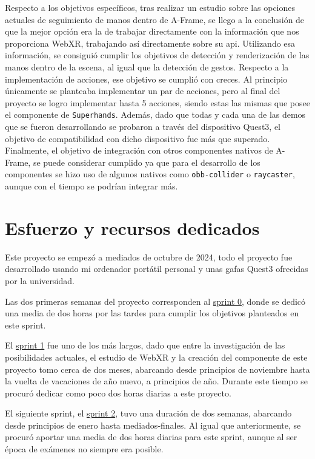 \documentclass[a4paper, 12pt]{book}
\begin{document}
Respecto a los objetivos específicos, tras realizar un estudio sobre las opciones actuales de seguimiento de manos dentro de A-Frame, se llego a la conclusión de que la mejor opción era la de trabajar directamente con la información que nos proporciona WebXR, trabajando así directamente sobre su api. 
Utilizando esa información, se consiguió cumplir los objetivos de detección y renderización de las manos dentro de la escena, al igual que la detección de gestos. 
Respecto a la implementación de acciones, ese objetivo se cumplió con creces. Al principio únicamente se planteaba implementar un par de acciones, pero al final del proyecto se logro implementar hasta 5 acciones, siendo estas las mismas que posee el componente de \texttt{Superhands}.
Además, dado que todas y cada una de las demos que se fueron desarrollando se probaron a través del dispositivo Quest3, el objetivo de compatibilidad con dicho dispositivo fue más que superado.
Finalmente, el objetivo de integración con otros componentes nativos de A-Frame, se puede considerar cumplido ya que para el desarrollo de los componentes se hizo uso de algunos nativos como \texttt{obb-collider} o \texttt{raycaster}, aunque con el tiempo se podrían integrar más.

\section{Esfuerzo y recursos dedicados}
\label{sec:esfuerzos}

Este proyecto se empezó a mediados de octubre de 2024, todo el proyecto fue desarrollado usando mi ordenador portátil personal y unas gafas Quest3 ofrecidas por la universidad.

Las dos primeras semanas del proyecto corresponden al \hyperref[sec:sprint0]{sprint 0}, donde se dedicó una media de dos horas por las tardes para cumplir los objetivos planteados en este sprint.

El \hyperref[sec:sprint1]{sprint 1} fue uno de los más largos, dado que entre la investigación de las posibilidades actuales, el estudio de WebXR y la creación del componente de este proyecto tomo cerca de dos meses, abarcando desde principios de noviembre hasta la vuelta de vacaciones de año nuevo, a principios de año. Durante este tiempo se procuró dedicar como poco dos horas diarias a este proyecto.

El siguiente sprint, el \hyperref[sec:sprint2]{sprint 2}, tuvo una duración de dos semanas, abarcando desde principios de enero hasta mediados-finales. Al igual que anteriormente, se procuró aportar una media de dos horas diarias para este sprint, aunque al ser época de exámenes no siempre era posible.
\end{document}
